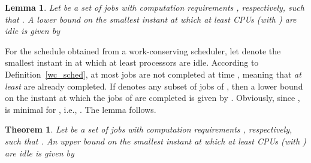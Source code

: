 \documentclass[10pt,english,a4paper]{article}
\newtheorem{theorem}{Theorem}
\newtheorem{lemma}{Lemma}
\newenvironment{proof}[1][Proof]{\begin{trivlist}
\item[\hskip \labelsep {\bfseries #1}]}{\end{trivlist}}
\newtheorem{validity test}{Validity Test}
\newcommand{\fin}{\hfill{\small }}     \newcommand{\oh}[1]{\ensuremath{\mathcal{0}{(#1)}}} \def\thefootnote{\arabic{footnote}}
\begin{document}
\begin{comment}
\begin{lemma}\label{earliest submakespan}
Let  be an -processor uniform platform with processor capacities such that  for all . Let  be any set of  jobs, all released at time , with computation requirements , respectively. If these jobs are scheduled according to a work-conserving  scheduler, then a lower bound  on the makespan is given by

where .
\end{lemma}
\begin{proof}
Let  denote the schedule of the  jobs obtained from any work-conserving  scheduler. Let  denote the smallest instant in  at which all the jobs are completed and suppose, by contradiction, that . If  denotes the smallest instant in  at which processor  is idle then it holds that . Since , we have

By multiplying both sides of the above inequality by , we get

Since we know that , the right-hand side of the above inequality can be rewritten as

And the Lemma follows from this contradiction. \fin
\end{proof}
\end{comment}


\begin{lemma}\label{earliest tidle}
Let  be a set of  jobs with computation requirements , respectively, such that . A lower bound  on the smallest instant  at which at least  CPUs (with ) are idle is given by

\end{lemma}

\begin{proof}
For the schedule  obtained from a work-conserving  scheduler, let  denote the smallest instant in  at which at least  processors are idle. According to Definition~\ref{wc_sched}, at most  jobs are not completed at time , meaning that \emph{at least}  are already completed. If  denotes any subset of  jobs of , then a lower bound  on the instant at which the  jobs of  are completed is given by . Obviously, since ,  is minimal for , i.e., . The lemma follows. \fin
\end{proof}

\begin{theorem}\label{latest tidle}
Let  be a set of  jobs with computation requirements , respectively, such that . An {\em upper bound}  on the smallest instant at which at least  CPUs (with ) are idle is given by

\end{theorem}
\end{document}
